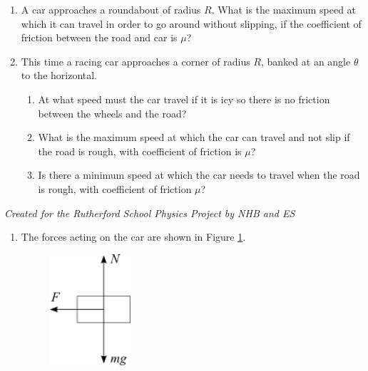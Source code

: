 \begin{problem}
{
\begin{enumerate}
\item A car approaches a roundabout of radius $R$. What is the maximum speed at which it can travel in order to go around without slipping, if the coefficient of friction between the road and car is $\mu$?
\item This time a racing car approaches a corner of radius $R$, banked at an angle $\theta$ to the horizontal. 
\begin{enumerate}
\item At what speed must the car travel if it is icy so there is no friction between the wheels and the road?
\item What is the maximum speed at which the car can travel and not slip if the road is rough, with coefficient of friction is $\mu$?
\item Is there a minimum speed at which the car needs to travel when the road is rough, with coefficient of friction $\mu$?\end{enumerate} \end{enumerate}} 
{\textit{Created for the Rutherford School Physics Project by NHB and ES}}
{\begin{enumerate}
\item The forces acting on the car are shown in Figure \ref{fig:CircularMotion_c}.
\begin{figure}[h]
\centering
\includegraphics[width=3cm]{CircularMotion_c}
\caption{}
\label{fig:CircularMotion_c}
\end{figure}
\\

\end{enumerate}}
\end{problem}
